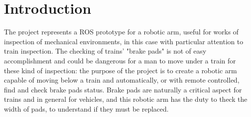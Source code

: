 \section{Introduction}
The project represents a ROS prototype for a robotic arm, useful for works of inspection of mechanical environments, in this case with particular attention to train inspection.
The checking of trains' "brake pads" is not of easy accomplishment and could be dangerous for a man to move under a train for these kind of inspection: the purpose of the project is to create a robotic arm capable of moving below a train and automatically, or with remote controlled, find and check brake pads status.
Brake pads are naturally a critical aspect for trains and in general for vehicles, and this robotic arm has the duty to theck the width of pads, to understand if they must be replaced.